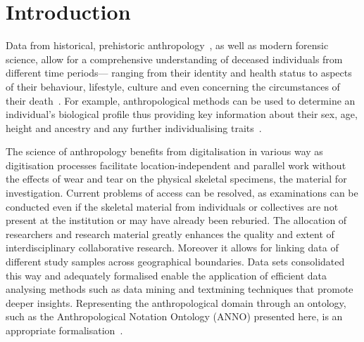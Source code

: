 \documentclass[sw]{iosart2x}
\newcommand{\aw}{AnthroWorks3D}
\begin{document}
\begin{frontmatter}
\begin{abstract}
Anthropology relies on osteometric measurements of human bones, but ...
In this paper, first, we describe the anthropology domain.
Then, we discuss design decisions of modelling ANNO.
Next, we show how ANNO is published for the community.
Finally, we describe the integration of the ontology into \aw{}.
\end{abstract}

\begin{keyword}
\end{keyword}

\end{frontmatter}



\section{Introduction}\label{sec:introduction}

Data from historical, prehistoric anthropology~\citep{prehistoricanthropology}, as well as modern forensic science, allow for a comprehensive understanding of deceased individuals from different time periods---
ranging from their identity and health status to aspects of their behaviour, lifestyle, culture and even concerning the circumstances of their death~\citep{spurensuche}.
For example, anthropological methods can be used to determine an individual's biological profile thus providing key information about their sex, age, height and ancestry and any further individualising traits~\citep{bioprofile}.

The science of anthropology benefits from digitalisation in various way as digitisation processes facilitate location-independent and parallel work without the effects of wear and tear on the physical skeletal specimens, the material for investigation.
Current problems of access can be resolved, as examinations can be conducted even if the skeletal material from individuals or collectives are not present at the institution or may have already been reburied.
The allocation of researchers and research material greatly enhances the quality and extent of interdisciplinary collaborative research.
Moreover it allows for linking data of different study samples across geographical boundaries.
Data sets consolidated this way and adequately formalised enable the application of efficient data analysing methods such as data mining and textmining techniques that promote deeper insights.
Representing the anthropological domain through an ontology, such as the Anthropological Notation Ontology (ANNO) presented here, is an appropriate formalisation~\citep{aw3dunpublished}.
\end{document}
